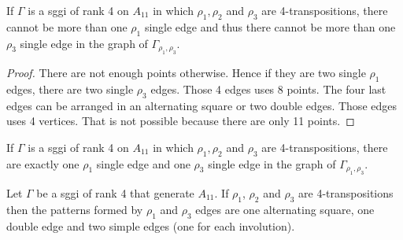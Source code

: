\begin{lemma}
    If $\Gamma$ is a sggi of rank 4 on $A_{11}$ in which $\rho_1, \rho_2$ and $\rho_3$ are 4-transpositions, there cannot be more than one $\rho_1$ single edge and thus there cannot be more than one $\rho_3$ single edge in the graph of $\Gamma_{\rho_1, \rho_3}$.
\end{lemma}

\begin{proof}
  There are not enough points otherwise. Hence if they are two single $\rho_1$ edges, there are two single $\rho_3$ edges. Those 4 edges uses 8 points. The four last edges can be arranged in an alternating square or two double edges. Those edges uses 4 vertices. That is not possible because there are only 11 points.
\end{proof}

\begin{corollary}
  \label{rank-4-single-1}
    If $\Gamma$ is a sggi of rank 4 on $A_{11}$ in which $\rho_1, \rho_2$ and $\rho_3$ are 4-transpositions, there are exactly one $\rho_1$ single edge and one $\rho_3$ single edge in the graph of $\Gamma_{\rho_1, \rho_3}$.
\end{corollary}

\begin{lemma}
  \label{rank-4-3-patterns}
  Let $\Gamma$ be a sggi of rank 4 that generate $A_{11}$. If $\rho_1$, $\rho_2$ and $\rho_3$ are 4-transpositions then the patterns formed by $\rho_1$ and $\rho_3$ edges are one alternating square, one double edge and two simple edges (one for each involution).
\end{lemma}

